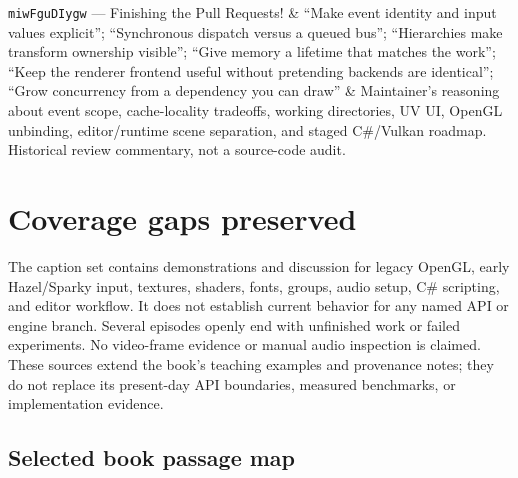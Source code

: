 {\begin{longtable}[]
\texttt{miwFguDIygw} --- Finishing the Pull Requests! & ``Make event identity and input values explicit''; ``Synchronous dispatch versus a queued bus''; ``Hierarchies make transform ownership visible''; ``Give memory a lifetime that matches the work''; ``Keep the renderer frontend useful without pretending backends are identical''; ``Grow concurrency from a dependency you can draw'' & Maintainer's reasoning about event scope, cache-locality tradeoffs, working directories, UV UI, OpenGL unbinding, editor/runtime scene separation, and staged C\#/Vulkan roadmap. Historical review commentary, not a source-code audit. \\
\end{longtable}
}

\section{Coverage gaps preserved}\label{appendix-877738f6f4d2-coverage-gaps-preserved}

The caption set contains demonstrations and discussion for legacy OpenGL, early Hazel/Sparky input, textures, shaders, fonts, groups, audio setup, C\# scripting, and editor workflow. It does not establish current behavior for any named API or engine branch. Several episodes openly end with unfinished work or failed experiments. No video-frame evidence or manual audio inspection is claimed. These sources extend the book's teaching examples and provenance notes; they do not replace its present-day API boundaries, measured benchmarks, or implementation evidence.

\subsection{Selected book passage map}\label{appendix-877738f6f4d2-selected-book-passage-map}

